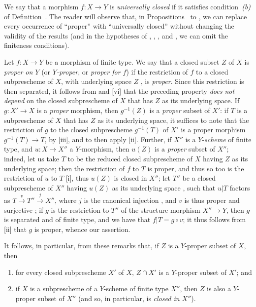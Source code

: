 \begin{rmk}[5.4.9]
\label{2.5.4.9}
We say that a morphism $f:X\to Y$ is \emph{universally closed} if it satisfies condition~\emph{(b)} of Definition~.
The reader will observe that,
in Propositions~ to , we can replace every occurrence of ``proper'' with ``universally closed'' without changing the validity of the results (and in the hypotheses of , , , and , we can omit the finiteness conditions).
\end{rmk}

\begin{env}[5.4.10]
\label{2.5.4.10}
Let $f:X\to Y$ be a morphism of finite type.
We say that a closed subset $Z$ of $X$ is \emph{proper on $Y$} (or \emph{$Y$-proper}, or \emph{proper for $f$}) if the restriction of $f$ to a closed subprescheme of $X$, with underlying space $Z$ , is \emph{proper}.
Since this restriction is then separated, it follows from  and [vi] that the preceding property \emph{does not depend} on the closed subprescheme of $X$ that has $Z$ as its underlying space.
If $g:X'\to X$ is a \emph{proper} morphism, then $g^{-1}(Z)$ is a \emph{proper} subset of $X'$:
if $T$ is a subprescheme of $X$ that has $Z$ as its underlying space, it suffices to note that the restriction of $g$ to the closed subprescheme $g^{-1}(T)$ of $X'$ is a proper morphism $g^{-1}(T)\to T$, by [iii], and to then apply [ii].
Further, if $X''$ is a $Y$-\emph{scheme} of finite type, and $u:X\to X''$ a $Y$-morphism, then $u(Z)$ is a \emph{proper} subset of $X''$;
indeed, let us take $T$ to be the reduced closed subprescheme of $X$ having $Z$ as its underlying space;
then the restriction of $f$ to $T$ is proper, and thus so too is the restriction of $u$ to $T$ [i], thus $u(Z)$ is closed in $X''$;
let $T''$ be a closed subprescheme of $X''$ having $u(Z)$ as its underlying space , such that $u|T$ factors as $T\xrightarrow{v}T''\xrightarrow{j}X''$, where $j$ is the canonical injection , and $v$ is thus proper and surjective ;
if $g$ is the restriction to $T''$ of the structure morphism $X''\to Y$, then $g$ is separated and of finite type, and we have that $f|T=g\circ v$;
it thus follows from [ii] that $g$ is proper, whence our assertion.
\end{env}

It follows, in particular, from these remarks that, if $Z$ is a $Y$-proper subset of $X$, then
\begin{enumerate}
    \item for every closed subprescheme $X'$ of $X$, $Z\cap X'$ is a $Y$-proper subset of $X'$; and
    \item if $X$ is a subprescheme of a $Y$-scheme of finite type $X''$, then $Z$ is also a $Y$-proper subset of $X''$ (and so, in particular, is \emph{closed in $X''$}).
\end{enumerate}

